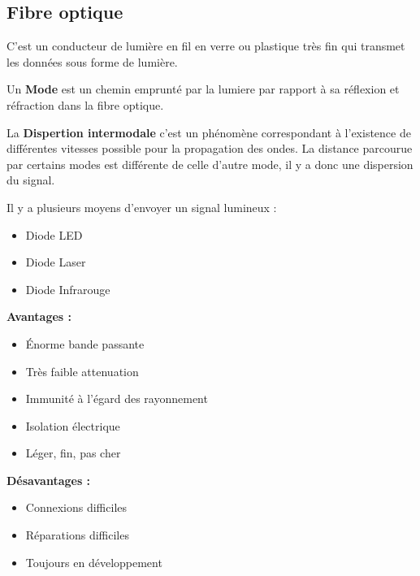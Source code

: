 	\subsection{Fibre optique}
		C'est un conducteur de lumière en fil en verre ou plastique très fin qui transmet les données sous forme de lumière.
		
		Un \textbf{Mode} est un chemin emprunté par la lumiere par rapport à sa réflexion et réfraction dans la fibre optique.
		
		La \textbf{Dispertion intermodale} c'est un phénomène correspondant à l'existence de différentes vitesses possible pour la propagation des ondes. La distance parcourue par certains modes est différente de celle d'autre mode, il y a donc une dispersion du signal.
		
		Il y a plusieurs moyens d'envoyer un signal lumineux :
		\begin{itemize}
			\item Diode LED
			\item Diode Laser
			\item Diode Infrarouge
		\end{itemize}

		\textbf{Avantages :}
		\begin{itemize}
			\item Énorme bande passante
			\item Très faible attenuation
			\item Immunité à l'égard des rayonnement
			\item Isolation électrique
			\item Léger, fin, pas cher
		\end{itemize}
		
		\textbf{Désavantages :}
		\begin{itemize}
			\item Connexions difficiles
			\item Réparations difficiles
			\item Toujours en développement
		\end{itemize}
		
